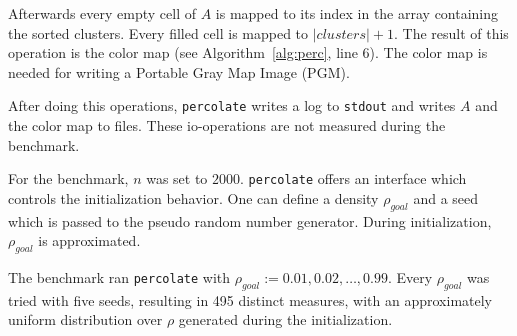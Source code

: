 \documentclass[twoside,11pt]{article}
\def\perc{\texttt{perco\-late}}
\begin{document}
Afterwards every empty cell of $A$ is mapped to its index
in the array containing the sorted clusters.
Every filled cell is mapped to $|clusters| + 1$.
The result of this operation is the color map (see
Algorithm~\ref{alg:perc}, line 6).
The color map is needed for writing a Portable Gray Map
Image (PGM).

After doing this operations, \perc{} writes a log to
\texttt{stdout} and writes $A$ and the color map to files.
These io-operations are not measured during the benchmark.

\begin{algorithm}
  \caption{: \perc{}}
  \label{alg:perc}

  \begin{algorithmic}[1]
  \end{algorithmic}
\end{algorithm}

\begin{algorithm}
  \caption{: build\_clusters($A'$)}
  \label{alg:build_clusters}

  \begin{algorithmic}[1]
      \ENDFOR
    \ENDWHILE
  \end{algorithmic}
\end{algorithm}

For the benchmark, $n$ was set to $2000$.
\perc{} offers an interface which controls the
initialization behavior.
One can define a density $\rho_{goal}$ and a seed which is
passed to the pseudo random number generator.
During initialization, $\rho_{goal}$ is approximated.

The benchmark ran \perc{} with $\rho_{goal} :=
0.01,0.02,\dots,0.99$. Every $\rho_{goal}$ was tried with
five seeds, resulting in 495 distinct measures, with an
approximately uniform distribution over $\rho$ generated
during the initialization.
\end{document}
